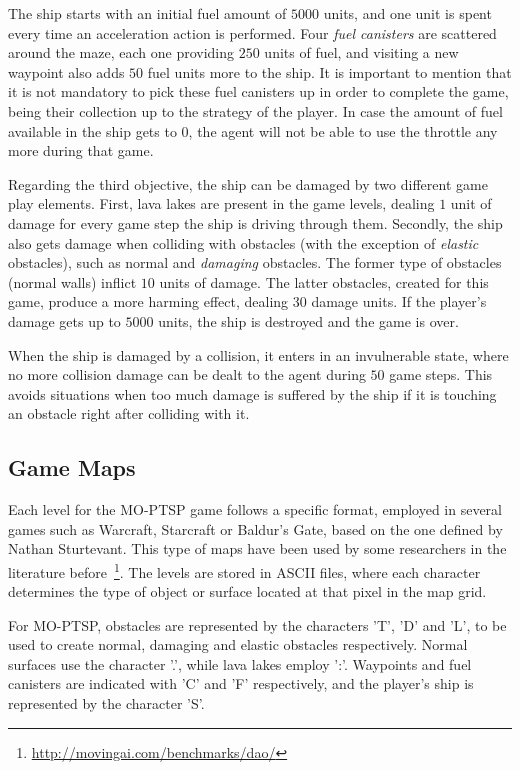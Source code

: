 \documentclass[conference]{IEEEtran}
\begin{document}
The ship starts with an initial fuel amount of $5000$ units, and one unit is spent every time an acceleration action is performed. Four \textit{fuel canisters} are scattered around the maze, each one providing $250$ units of fuel, and visiting a new waypoint also adds $50$ fuel units more to the ship. It is important to mention that it is not mandatory to pick these fuel canisters up in order to complete the game, being their collection up to the strategy of the player. In case the amount of fuel available in the ship gets to $0$, the agent will not be able to use the throttle any more during that game. 

Regarding the third objective, the ship can be damaged by two different game play elements. First, lava lakes are present in the game levels, dealing $1$ unit of damage for every game step the ship is driving through them. Secondly, the ship also gets damage when colliding with obstacles (with the exception of \textit{elastic} obstacles), such as normal and \textit{damaging} obstacles. The former type of obstacles (normal walls) inflict $10$ units of damage. The latter obstacles, created for this game, produce a more harming effect, dealing $30$ damage units. If the player's damage gets up to $5000$ units, the ship is destroyed and the game is over.

When the ship is damaged by a collision, it enters in an invulnerable state, where no more collision damage can be dealt to the agent during $50$ game steps. This avoids situations when too much damage is suffered by the ship if it is touching an obstacle right after colliding with it.

\subsection{Game Maps}

Each level for the MO-PTSP game follows a specific format, employed in several games such as Warcraft, Starcraft or Baldur's Gate, based on the one defined by Nathan Sturtevant. This type of maps have been used by some researchers in the literature before~\footnote{\url{http://movingai.com/benchmarks/dao/}}. The levels are stored in ASCII files, where each character determines the type of object or surface located at that pixel in the map grid. 

For MO-PTSP, obstacles are represented by the characters 'T', 'D' and 'L', to be used to create normal, damaging and elastic obstacles respectively. Normal surfaces use the character '.', while lava lakes employ ':'. Waypoints and fuel canisters are indicated with 'C' and 'F' respectively, and the player's ship is represented by the character 'S'.
\end{document}

